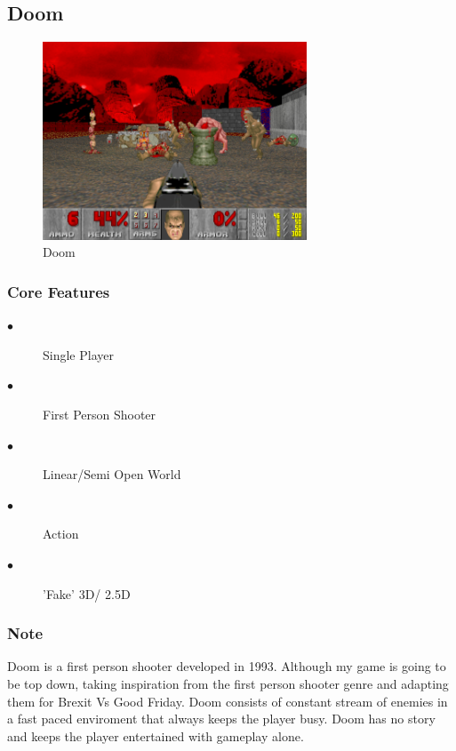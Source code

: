 \documentclass[a4paper]{scrreprt}
\begin{document}
        \subsection{Doom}

            \begin{figure}[H]
                \centering
                \includegraphics[width=0.70\textwidth]{doom.png}
                \caption{\label{fig:art} Doom}
            \end{figure}

            \subsubsection{Core Features}
            \begin{description}
                \item[$\bullet$] Single Player
                \item[$\bullet$] First Person Shooter
                \item[$\bullet$] Linear/Semi Open World
                \item[$\bullet$] Action
                \item[$\bullet$] 'Fake' 3D/ 2.5D
            \end{description}

            \subsubsection{Note}
            Doom is a first person shooter developed in 1993. 
            Although my game is going to be top down, taking inspiration from the first person shooter genre and adapting them for Brexit Vs Good Friday.
            Doom consists of constant stream of enemies in a fast paced enviroment that always keeps the player busy.
            Doom has no story and keeps the player entertained with gameplay alone.
\end{document}
